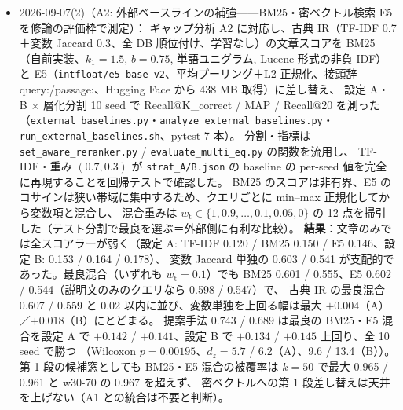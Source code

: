 \documentclass[11pt,a4paper]{jsarticle}
\begin{document}
\begin{itemize}[nosep]
    (b) 本研究の入出力（Query＝説明文＋入出力変数 $\to$ 11,146 式・361 source の DB $\to$ 文献別に色分けした CSTR の 3 式を共有変数 $r_A$・$k$ の辺で結び「3 equations, 3 unknowns: DoF 0」）。
    辺は共有変数に厳密対応（加藤ルール B1/B3）、$\tau$ は持ち込まない。pytest 2 本（生成物とラベル・辺ラベルの検証）。
    \texttt{latexmk -gg} exit 0・30 ページ（28 $\to$ 30）・未定義参照なし・Overfull は既存 1 件のみ。図は章 2 ページ目の上部に配置された（圧縮設定解除後に再確認）。
    設計書 \texttt{docs/superpowers/specs/2026-09-07-w2-introduction-design.md}。残: W3（第 7 章と Abstract）。
  \item 2026-09-07(2)（A2: 外部ベースラインの補強——BM25・密ベクトル検索 E5 を修論の評価枠で測定）：
    ギャップ分析 A2 に対応し、古典 IR（TF-IDF 0.7＋変数 Jaccard 0.3、全 DB 順位付け、学習なし）の文章スコアを
    BM25（自前実装、$k_1=1.5$, $b=0.75$, 単語ユニグラム, Lucene 形式の非負 IDF）と
    E5（\texttt{intfloat/e5-base-v2}、平均プーリング＋L2 正規化、接頭辞 query:/passage:、Hugging Face から 438 MB 取得）に差し替え、
    設定 A・B $\times$ 層化分割 10 seed で Recall@K\_correct / MAP / Recall@20 を測った
    （\texttt{external\_baselines.py}・\texttt{analyze\_external\_baselines.py}・\texttt{run\_external\_baselines.sh}、pytest 7 本）。
    分割・指標は \texttt{set\_aware\_reranker.py} / \texttt{evaluate\_multi\_eq.py} の関数を流用し、
    TF-IDF・重み $(0.7, 0.3)$ が \texttt{strat\_A/B.json} の baseline の per-seed 値を完全に再現することを回帰テストで確認した。
    BM25 のスコアは非有界、E5 のコサインは狭い帯域に集中するため、クエリごとに min--max 正規化してから変数項と混合し、
    混合重みは $w_{\mathrm{t}} \in \{1, 0.9, \ldots, 0.1, 0.05, 0\}$ の 12 点を掃引した（テスト分割で最良を選ぶ＝外部側に有利な比較）。
    \textbf{結果}：文章のみでは全スコアラーが弱く（設定 A: TF-IDF 0.120 / BM25 0.150 / E5 0.146、設定 B: 0.153 / 0.164 / 0.178）、
    変数 Jaccard 単独の 0.603 / 0.541 が支配的であった。最良混合（いずれも $w_{\mathrm{t}}=0.1$）でも
    BM25 0.601 / 0.555、E5 0.602 / 0.544（説明文のみのクエリなら 0.598 / 0.547）で、
    古典 IR の最良混合 0.607 / 0.559 と 0.02 以内に並び、変数単独を上回る幅は最大 $+0.004$（A）／$+0.018$（B）にとどまる。
    提案手法 0.743 / 0.689 は最良の BM25・E5 混合を設定 A で $+0.142$ / $+0.141$、設定 B で $+0.134$ / $+0.145$ 上回り、全 10 seed で勝つ
    （Wilcoxon $p=0.00195$、$d_z=5.7$ / 6.2（A）、9.6 / 13.4（B））。
    第 1 段の候補窓としても BM25・E5 混合の被覆率は $k=50$ で最大 0.965 / 0.961 と w30-70 の 0.967 を超えず、
    密ベクトルへの第 1 段差し替えは天井を上げない（A1 との統合は不要と判断）。

\end{itemize}
\end{document}
